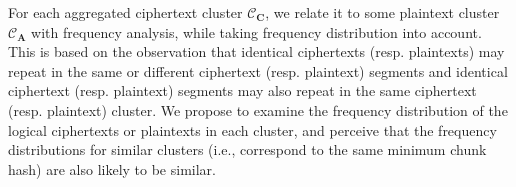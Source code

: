 
For each aggregated ciphertext cluster $\mathcal{C}_\mathbf{C}$, we relate it to some plaintext cluster $\mathcal{C}_\mathbf{A}$ with frequency analysis, while taking frequency distribution into account. This is based on the observation that identical ciphertexts (resp. plaintexts) may  repeat in the same or different ciphertext (resp. plaintext) segments and identical ciphertext (resp. plaintext) segments may also repeat in the same ciphertext (resp. plaintext) cluster. We propose to examine the frequency distribution of the logical ciphertexts or plaintexts in each cluster, and perceive that the frequency distributions for similar clusters (i.e., correspond to the same minimum chunk hash) are also likely to be similar. 

